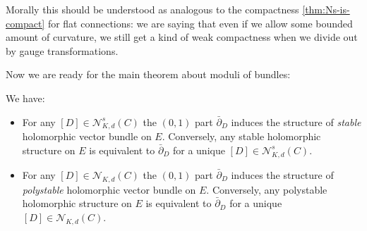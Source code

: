 \documentclass[12pt,letterpaper,reqno]{article}
\numberwithin{equation}{section}
\newcommand{\cN}{\ensuremath{\mathcal N}}
\newcommand{\ti}[1]{\textit{#1}}
\begin{document}
Morally this should be understood as analogous to the compactness
\autoref{thm:Ns-is-compact} for flat connections: we are saying that
even if we allow some bounded amount of curvature, we still get a 
kind of weak compactness when we divide out by gauge transformations.


Now we are ready for the main theorem about moduli of bundles:

\begin{thm}  \label{thm:narasimhan-seshadri}
\cite{MR32:1725}
We have:
\begin{itemize}
\item For any $[D] \in \cN^s_{K,d}(C)$ the $(0,1)$ part $\bar\partial_D$
induces the structure of \ti{stable} holomorphic vector bundle on $E$.
Conversely, any stable holomorphic structure 
on $E$ is equivalent to $\bar\partial_D$ for a unique $[D] \in \cN^s_{K,d}(C)$.
\item For any $[D] \in \cN_{K,d}(C)$ the $(0,1)$ part $\bar\partial_D$
induces the structure of \ti{polystable} holomorphic vector bundle on $E$.
Conversely, any polystable holomorphic structure 
on $E$ is equivalent to $\bar\partial_D$ for a unique $[D] \in \cN_{K,d}(C)$.
\end{itemize}
\end{thm}
\end{document}
